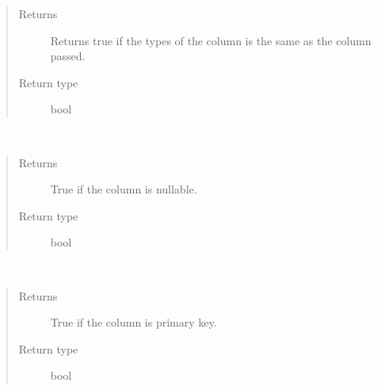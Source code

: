 \documentclass[letterpaper,10pt,english]{sphinxmanual}
\begin{document}
\begin{fulllineitems}
\begin{fulllineitems}
\begin{quote}
\begin{description}
\item[{Returns}] \leavevmode
\sphinxAtStartPar
Returns true if the types of the column is the same
as the column passed.

\item[{Return type}] \leavevmode
\sphinxAtStartPar
bool

\end{description}\end{quote}

\end{fulllineitems}


\begin{fulllineitems}
\label{\detokenize{model:mini_sql.model.column.Column.is_nullable}}~\begin{quote}\begin{description}
\item[{Returns}] \leavevmode
\sphinxAtStartPar
True if the column is nullable.

\item[{Return type}] \leavevmode
\sphinxAtStartPar
bool

\end{description}\end{quote}

\end{fulllineitems}


\begin{fulllineitems}
\label{\detokenize{model:mini_sql.model.column.Column.is_primary_key}}~\begin{quote}\begin{description}
\item[{Returns}] \leavevmode
\sphinxAtStartPar
True if the column is primary key.

\item[{Return type}] \leavevmode
\sphinxAtStartPar
bool

\end{description}\end{quote}


\end{fulllineitems}
\end{fulllineitems}
\end{document}
